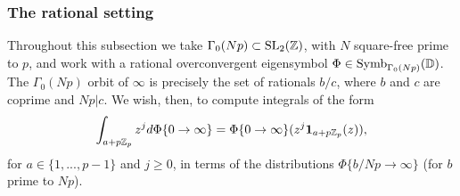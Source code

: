 \documentclass[a4paper,10pt]{article}
\numberwithin{equation}{section}
\begin{document}



\subsubsection{The rational setting}
Throughout this subsection we take $\Gamma_0(Np) \subset \mathrm{SL}_2(\mathbb{Z})$, with $N$ square-free prime to $p$, and work with a rational overconvergent eigensymbol $\Phi \in \mathrm{Symb}_{\Gamma_0(Np)}(\mathbb{D})$. The $\Gamma_0(Np)$ orbit of $\infty$ is precisely the set of rationals $b/c$, where $b$ and $c$ are coprime and $Np|c$. We wish, then, to compute integrals of the form
\[
 \int_{a+p\mathbb{Z}_p}z^j d\Phi\{0\rightarrow\infty\} = \Phi\{0\rightarrow\infty\}(z^j\mathbf{1}_{a+p\mathbb{Z}_p}(z)),
\]
for $a \in \{1,...,p-1\}$ and $j \geq 0$, in terms of the distributions $\Phi\{b/Np\rightarrow\infty\}$ (for $b$ prime to $Np$).
\end{document}
